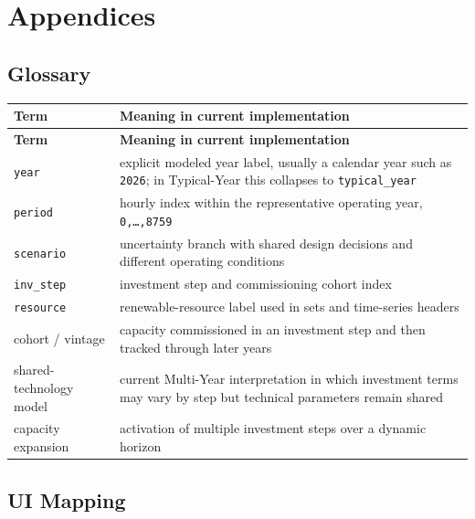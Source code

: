 \documentclass[11pt,a4paper]{report}
\newcommand{\code}[1]{\texttt{#1}}
\begin{document}
\part{Appendices}

\appendix

\chapter{Glossary}\label{sec:appendix-glossary}

\begin{longtable}{p{}p{}}
\toprule
\textbf{Term} & \textbf{Meaning in current implementation} \\
\midrule
\endfirsthead
\toprule
\textbf{Term} & \textbf{Meaning in current implementation} \\
\midrule
\endhead
\code{year} & explicit modeled year label, usually a calendar year such as \code{2026}; in Typical-Year this collapses to \code{typical\_year} \\
\code{period} & hourly index within the representative operating year, \code{0,\dots,8759} \\
\code{scenario} & uncertainty branch with shared design decisions and different operating conditions \\
\code{inv\_step} & investment step and commissioning cohort index \\
\code{resource} & renewable-resource label used in sets and time-series headers \\
cohort / vintage & capacity commissioned in an investment step and then tracked through later years \\
shared-technology model & current Multi-Year interpretation in which investment terms may vary by step but technical parameters remain shared \\
capacity expansion & activation of multiple investment steps over a dynamic horizon \\
\bottomrule
\end{longtable}

\chapter{UI Mapping}\label{sec:appendix-ui}
\end{document}
